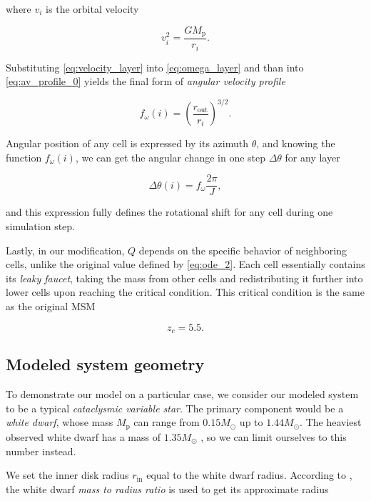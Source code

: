 where $v_i$ is the orbital velocity

\begin{equation}
    v_i^2 = \frac{G M_{\text{p}}}{r_i}.
    \label{eq:velocity_layer}
\end{equation}

Substituting \eqref{eq:velocity_layer} into \eqref{eq:omega_layer} and than into \eqref{eq:av_profile_0} yields the final form of \emph{angular velocity profile}

\begin{equation}
	f_{\omega}(i) = \left(\frac{r_{\text{out}}}{r_i}\right)^{3/2}.
\end{equation}

Angular position of any cell is expressed by its azimuth $\theta$, and knowing the function $f_{\omega}(i)$, we can get the angular change in one step $\Delta \theta$ for any layer

\begin{equation}
	\Delta \theta (i) = f_{\omega} \frac{2 \pi}{J},
	\label{eq:delta_azimuth} 
\end{equation}

and this expression fully defines the rotational shift for any cell during one simulation step.

Lastly, in our modification, $Q$ depends on the specific behavior of neighboring cells, unlike the original value defined by \eqref{eq:ode_2}. Each cell essentially contains its \emph{leaky faucet}, taking the mass from other cells and redistributing it further into lower cells upon reaching the critical condition. This critical condition is the same as the original MSM

\begin{equation}
	z_c = 5.5.
	\label{eq:z_critical_model}
\end{equation}

\subsection{Modeled system geometry}

To demonstrate our model on a particular case, we consider our modeled system to be a typical \emph{cataclysmic variable star}. The primary component would be a \emph{white dwarf}, whose mass $M_{\text{p}}$ can range from $0.15 M_{\odot}$ up to $1.44 M_{\odot}$. The heaviest observed white dwarf has a mass of $1.35 M_{\odot}$ \cite{caiazzo2021}, so we can limit ourselves to this number instead.

We set the inner disk radius $r_{\text{in}}$ equal to the white dwarf radius. According to \cite{shapiro1983}, the white dwarf \emph{mass to radius ratio} is used to get its approximate radius

